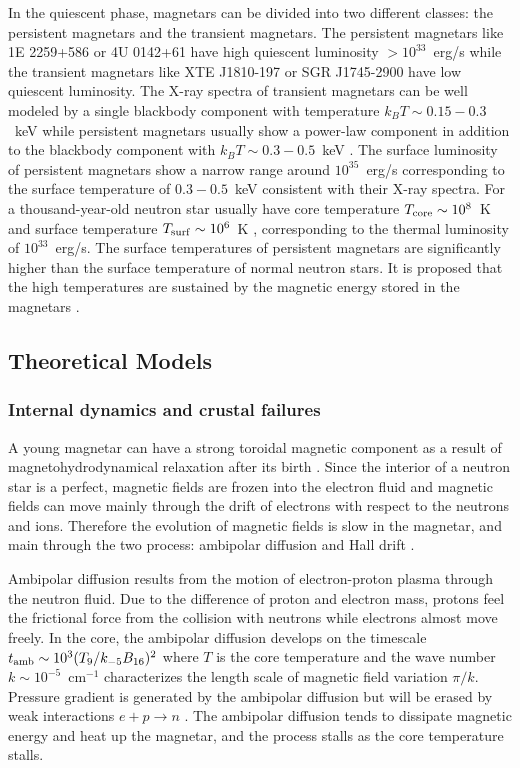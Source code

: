 In the quiescent phase, magnetars can be divided into two different classes: the persistent magnetars and the transient magnetars.
The persistent magnetars like 1E 2259+586 or 4U 0142+61 have high quiescent luminosity $>10^{33}$~erg/s while the transient magnetars like XTE J1810-197 or SGR J1745-2900  have low quiescent luminosity.
The X-ray spectra of transient magnetars can be well modeled by a single blackbody component with temperature $k_B T\sim 0.15-0.3$~keV while persistent magnetars usually show a power-law component in addition to the blackbody component with $k_B T\sim 0.3-0.5$~keV \citep{2014ApJS..212....6O}.
The surface luminosity of persistent magnetars show a narrow range around $10^{35}$~erg/s \citep{2006ApJ...650.1070D} corresponding to the surface temperature of $0.3-0.5$~keV consistent with their X-ray spectra.
For a thousand-year-old neutron star usually have core temperature $T_{\rm core}\sim 10^8$~K and surface temperature $T_{\rm surf}\sim 10^6$~K \citep{2004ARA&A..42..169Y}, corresponding to the thermal luminosity of $10^{33}$~erg/s.
The surface temperatures of persistent magnetars are significantly higher than the surface temperature of normal neutron stars.
It is proposed that the high temperatures are sustained by the magnetic energy stored in the magnetars \citep{1992ApJ...392L...9D,1992AcA....42..145P} .

\subsection{Theoretical Models}
\subsubsection{Internal dynamics and crustal failures}
A young magnetar can have a strong toroidal magnetic component as a result of magnetohydrodynamical relaxation after its birth \citep{2009MNRAS.397..763B}.
Since the interior of a neutron star is a perfect, magnetic fields are frozen into the electron fluid and magnetic fields can move mainly through the drift of electrons with respect to the neutrons and ions.
Therefore the evolution of magnetic fields is slow in the magnetar, and main through the two process: ambipolar diffusion and Hall drift \citep{1992ApJ...395..250G}.

Ambipolar diffusion results from the motion of electron-proton plasma through the neutron fluid. 
Due to the difference of proton and electron mass, protons feel the frictional force from the collision with neutrons while electrons almost move freely.
In the core, the ambipolar diffusion  develops on the timescale $t_{\rm amb}\sim 10^3 (T_9/k_{-5}B_{16})^2$ \citep{2016ApJ...833..261B} where $T$ is the core temperature and the wave number $k\sim 10^{-5}$~cm$^{-1}$ characterizes the length scale of magnetic field variation $\pi/k$.
Pressure gradient is generated by the ambipolar diffusion but will be erased by weak interactions $e+p\rightarrow n$ \citep{1992ApJ...395..250G,2016ApJ...833..261B}.
The ambipolar diffusion tends to dissipate magnetic energy and heat up the magnetar, and the process stalls as the core temperature stalls.

